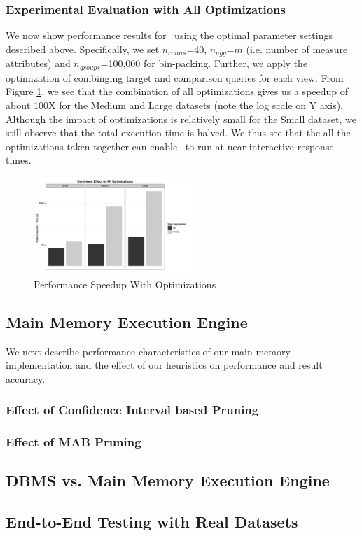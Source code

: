 \subsubsection{Experimental Evaluation with All Optimizations}

We now show performance results for \VizRecDB\ using the optimal parameter settings
described above. Specifically, we set $n_{conns}$=40, $n_{agg}$=$m$ (i.e.
number of measure attributes) and $n_{groups}$=100,000 for bin-packing. Further,
we apply the optimization of combinging target and comparison queries for each view. From
Figure \ref{fig:total_speed_up}, we see that the combination of all
optimizations gives us a speedup of about 100X for the Medium and Large
datasets (note the log scale on Y axis). Although the impact of optimizations is
relatively small for the Small dataset, we still observe that the total
execution time is halved. We thus see that the all the optimizations
taken together can enable \VizRecDB\ to run at near-interactive response times.

\begin{figure}[h]
  \centering
    \includegraphics[width=6cm]{Images/total_speedup.pdf}
  \caption{Performance Speedup With Optimizations} 
  \label{fig:total_speed_up}
\end{figure}

\subsection{Main Memory Execution Engine}

We next describe performance characteristics of our main memory implementation
and the effect of our heuristics on performance and result accuracy.

\subsubsection{Effect of Confidence Interval based Pruning}

\subsubsection{Effect of MAB Pruning}

\subsection{DBMS vs. Main Memory Execution Engine}

\subsection{End-to-End Testing with Real Datasets}
